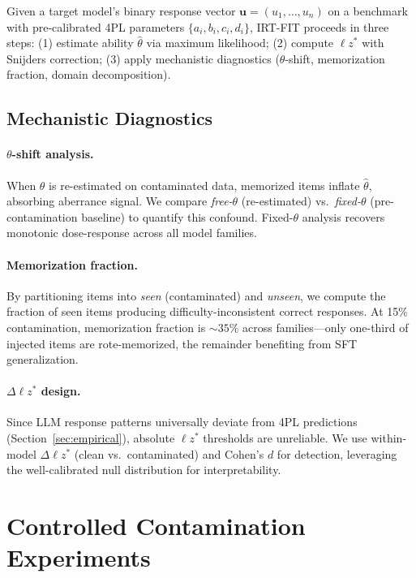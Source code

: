 \documentclass[11pt,twocolumn]{article}
\newcommand{\lzs}{\ensuremath{\ell z^*}}
\begin{document}
Given a target model's binary response vector $\mathbf{u} = (u_1, \ldots, u_n)$ on a benchmark with pre-calibrated 4PL parameters $\{a_i, b_i, c_i, d_i\}$, IRT-FIT proceeds in three steps: (1) estimate ability $\hat{\theta}$ via maximum likelihood; (2) compute $\lzs$ with Snijders correction; (3) apply mechanistic diagnostics ($\theta$-shift, memorization fraction, domain decomposition).

\subsection{Mechanistic Diagnostics}

\paragraph{$\theta$-shift analysis.} When $\theta$ is re-estimated on contaminated data, memorized items inflate $\hat{\theta}$, absorbing aberrance signal. We compare \emph{free-$\theta$} (re-estimated) vs.\ \emph{fixed-$\theta$} (pre-contamination baseline) to quantify this confound. Fixed-$\theta$ analysis recovers monotonic dose-response across all model families.

\paragraph{Memorization fraction.} By partitioning items into \emph{seen} (contaminated) and \emph{unseen}, we compute the fraction of seen items producing difficulty-inconsistent correct responses. At 15\% contamination, memorization fraction is ${\sim}35$\% across families---only one-third of injected items are rote-memorized, the remainder benefiting from SFT generalization.

\paragraph{$\Delta\lzs$ design.} Since LLM response patterns universally deviate from 4PL predictions (Section~\ref{sec:empirical}), absolute $\lzs$ thresholds are unreliable. We use within-model $\Delta\lzs$ (clean vs.\ contaminated) and Cohen's $d$ for detection, leveraging the well-calibrated null distribution for interpretability.

\section{Controlled Contamination Experiments}
\end{document}
